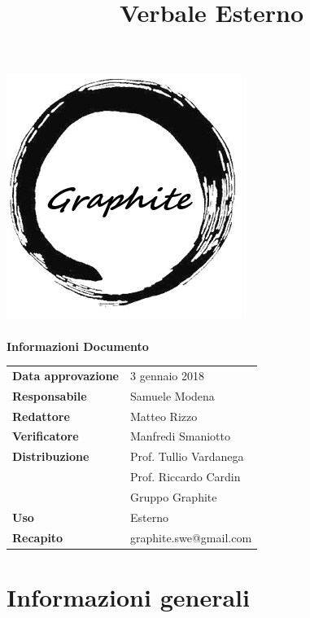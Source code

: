 \documentclass[openany,12pt,a4paper]{article}
\title{Verbale Esterno}
\author{}
\begin{document}
 
  \makeatletter 
  \begin{titlepage} 
    \setlength{\headsep}{0pt}   
    \begin{center} 
      \includegraphics[width=0.5\linewidth]{Logo.png}\\[1em] 
      {\huge \bfseries  \@title }\\[10ex] 
      \textbf{\Large Informazioni Documento} \\[2em] 
      \bgroup 
      \def\arraystretch{1.5} 
      \begin{tabular}{l|l} 
        \textbf{Data approvazione} & 3 gennaio 2018 \\ 
        \textbf{Responsabile} & Samuele Modena \\ 
        \textbf{Redattore} & Matteo Rizzo \\ 
        \textbf{Verificatore} & Manfredi Smaniotto \\ 
        \textbf{Distribuzione} & Prof. Tullio Vardanega \\ 
         & Prof. Riccardo Cardin \\ 
         & Gruppo Graphite \\ 
        \textbf{Uso} & Esterno \\ 
        \textbf{Recapito} & graphite.swe@gmail.com \\ 
      \end{tabular} 
    \egroup 
    \end{center} 
  \end{titlepage} 
  \makeatother 
 
  \thispagestyle{empty} 
  \newpage 
   
  \tableofcontents 
  \newpage 
   
  \section{Informazioni generali} 
   
\end{document}
